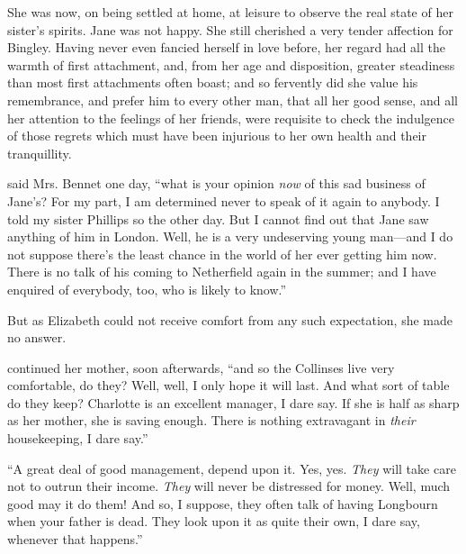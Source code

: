 She was now, on being settled at home, at leisure to observe the real state of her sister's spirits. Jane was not happy. She still cherished a very tender affection for Bingley. Having never even fancied herself in love before, her regard had all the warmth of first attachment, and, from her age and disposition, greater steadiness than most first attachments often boast; and so fervently did she value his remembrance, and prefer him to every other man, that all her good sense, and all her attention to the feelings of her friends, were requisite to check the indulgence of those regrets which must have been injurious to her own health and their tranquillity.

 said Mrs. Bennet one day, “what is your opinion {\em now} of this sad business of Jane's? For my part, I am determined never to speak of it again to anybody. I told my sister Phillips so the other day. But I cannot find out that Jane saw anything of him in London. Well, he is a very undeserving young man---and I do not suppose there's the least chance in the world of her ever getting him now. There is no talk of his coming to Netherfield again in the summer; and I have enquired of everybody, too, who is likely to know.”



But as Elizabeth could not receive comfort from any such expectation, she made no answer.

 continued her mother, soon afterwards, “and so the Collinses live very comfortable, do they? Well, well, I only hope it will last. And what sort of table do they keep? Charlotte is an excellent manager, I dare say. If she is half as sharp as her mother, she is saving enough. There is nothing extravagant in {\em their} housekeeping, I dare say.”


“A great deal of good management, depend upon it. Yes, yes. {\em They} will take care not to outrun their income. {\em They} will never be distressed for money. Well, much good may it do them! And so, I suppose, they often talk of having Longbourn when your father is dead. They look upon it as quite their own, I dare say, whenever that happens.”

